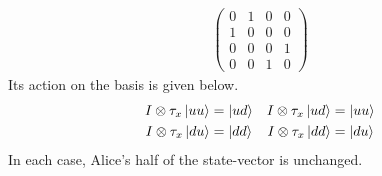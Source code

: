 \begin{answer}
\begin{align*}
		\begin{pmatrix}
			0 & 1 & 0 & 0 \\
			1 & 0 & 0 & 0 \\
			0 & 0 & 0 & 1 \\
			0 & 0 & 1 & 0
		\end{pmatrix}
	\end{align*}
	Its action on the basis is given below.
	\begin{align*}
		I \otimes \tau_x \ket{u u} & = \ket{u d} &
		I \otimes \tau_x \ket{u d} & = \ket{u u}   \\
		I \otimes \tau_x \ket{d u} & = \ket{d d} &
		I \otimes \tau_x \ket{d d} & = \ket{d u}
	\end{align*}
	In each case, Alice's half of the state-vector is unchanged.
\end{answer}

